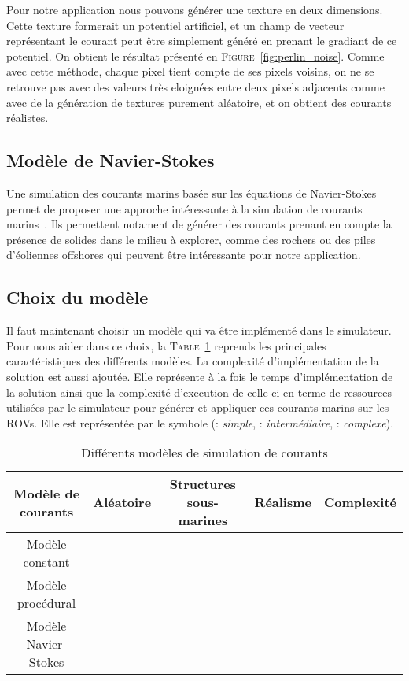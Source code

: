 				Pour notre application nous pouvons générer une texture en deux dimensions. Cette texture formerait un potentiel artificiel, et un champ de vecteur représentant le courant peut être simplement généré en prenant le gradiant de ce potentiel. On obtient le résultat présenté en \textsc{Figure}~\ref{fig:perlin_noise}. Comme avec cette méthode, chaque pixel tient compte de ses pixels voisins, on ne se retrouve pas avec des valeurs très eloignées entre deux pixels adjacents comme avec de la génération de textures purement aléatoire, et on obtient des courants réalistes. 

			\subsection{Modèle de Navier-Stokes}

				Une simulation des courants marins basée sur les équations de Navier-Stokes permet de proposer une approche intéressante à la simulation de courants marins~\cite{Garau2006current}. Ils permettent notament de générer des courants prenant en compte la présence de solides dans le milieu à explorer, comme des rochers ou des piles d'éoliennes offshores qui peuvent être intéressante pour notre application.

			\subsection{Choix du modèle}

				Il faut maintenant choisir un modèle qui va être implémenté dans le simulateur. Pour nous aider dans ce choix, la \textsc{Table}~\ref{table:courants} reprends les principales caractéristiques des différents modèles. La complexité d'implémentation de la solution est aussi ajoutée. Elle représente à la fois le temps d'implémentation de la solution ainsi que la complexité d'execution de celle-ci en terme de ressources utilisées par le simulateur pour générer et appliquer ces courants marins sur les \gls{ROV}s. Elle est représentée par le symbole \pmark (\pmark : \textit{simple}, \pmark \pmark : \textit{intermédiaire}, \pmark \pmark \pmark : \textit{complexe}).

				\begin{table}[ht]
					\centering
					\begin{tabular}{|c|c|c|c|c|}
						\hline
						\textbf{Modèle de courants} & \textbf{Aléatoire} & \textbf{Structures sous-marines} & \textbf{Réalisme} & \textbf{Complexité} \\
						\hline
						Modèle constant & \xmark & \xmark & \pmark & \pmark\\
						\hline
						Modèle procédural & \cmark & \xmark & \pmark \pmark & \pmark \pmark\\
						\hline
						Modèle Navier-Stokes & \xmark & \cmark & \pmark \pmark \pmark & \pmark \pmark \pmark \\
						\hline
					\end{tabular}
					\caption{Différents modèles de simulation de courants}
					\label{table:courants}
				\end{table}

